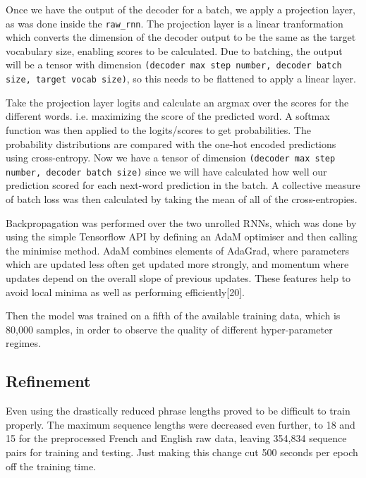 \documentclass[]{article}
\begin{document}
Once we have the output of the decoder for a batch, we apply a projection layer, as was done inside the \lstinline{raw_rnn}. The projection layer is a linear tranformation which converts the dimension of the decoder output to be the same as the target vocabulary size, enabling scores to be calculated. Due to batching, the output will be a tensor with dimension \lstinline{(decoder max step number, decoder batch size, target vocab size)}, so this needs to be flattened to apply a linear layer.

Take the projection layer logits and calculate an argmax over the scores for the different words. i.e. maximizing the score of the predicted word. A softmax function was then applied to the logits/scores to get probabilities. The probability distributions are compared with the one-hot encoded predictions using cross-entropy. Now we have a tensor of dimension \lstinline{(decoder max step number, decoder batch size)} since we will have calculated how well our prediction scored for each next-word prediction in the batch. A collective measure of batch loss was then calculated by taking the mean of all of the cross-entropies.

Backpropagation was performed over the two unrolled RNNs, which was done by using the simple Tensorflow API by defining an AdaM optimiser and then calling the minimise method. AdaM combines elements of AdaGrad, where parameters which are updated less often get updated more strongly, and momentum where updates depend on the overall slope of previous updates. These features help to avoid local minima as well as performing efficiently[20].
\iffalse
\texttt{[image: "C:/Users/mbcxrhm2/Dropbox/PhD/1st year/DrivenTLS/Images/alpha\_ph Dep/Populations/a0p01\_T6000".png]}
![seq2seq at training time](pictures/1-seq2seq.png)
\fi

Then the model was trained on a fifth of the available training data, which is 80,000 samples, in order to observe the quality of different hyper-parameter regimes.
\subsection{Refinement}
Even using the drastically reduced phrase lengths proved to be difficult to train properly. The maximum sequence lengths were decreased even further, to 18 and 15 for the preprocessed French and English raw data, leaving 354,834 sequence pairs for training and testing. Just making this change cut 500 seconds per epoch off the training time.
\end{document}
